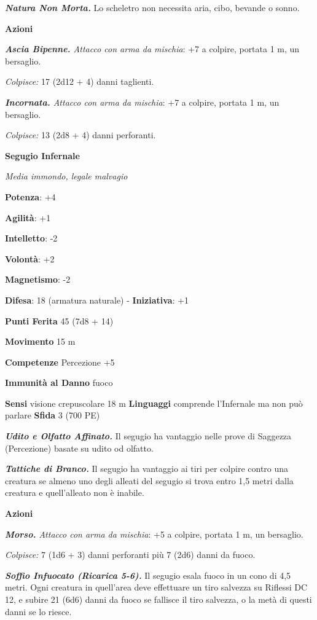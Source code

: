 \begin{multicols}{2}
\emph{\textbf{Natura Non Morta.}} Lo scheletro non necessita aria, cibo,
bevande o sonno.

\smallskip\textbf{Azioni}

\emph{\textbf{Ascia Bipenne.} Attacco con arma da mischia}: +7 a
colpire, portata 1 m, un bersaglio.

\emph{Colpisce:} 17 (2d12 + 4) danni taglienti.

\emph{\textbf{Incornata.} Attacco con arma da mischia}: +7 a colpire,
portata 1 m, un bersaglio.

\emph{Colpisce:} 13 (2d8 + 4) danni perforanti.

\textbf{Segugio Infernale}

\emph{Media immondo, legale malvagio}

\textbf{Potenza}: +4

\textbf{Agilità}: +1

\textbf{Intelletto}: -2

\textbf{Volontà}: +2

\textbf{Magnetismo}: -2

\textbf{Difesa}: 18 (armatura naturale) - \textbf{Iniziativa}: +1

\textbf{Punti Ferita} 45 (7d8 + 14)

\textbf{Movimento} 15 m

\textbf{Competenze} Percezione +5

\textbf{Immunità al Danno} fuoco

\textbf{Sensi} visione crepuscolare 18 m
\textbf{Linguaggi} comprende l'Infernale ma non può parlare
\textbf{Sfida} 3 (700 PE)\smallskip

\emph{\textbf{Udito e Olfatto Affinato.}} Il segugio ha vantaggio nelle
prove di Saggezza (Percezione) basate su udito od olfatto.

\emph{\textbf{Tattiche di Branco.}} Il segugio ha vantaggio ai tiri per
colpire contro una creatura se almeno uno degli alleati del segugio si
trova entro 1,5 metri dalla creatura e quell'alleato non è inabile.

\smallskip\textbf{Azioni}

\emph{\textbf{Morso.} Attacco con arma da mischia}: +5 a colpire,
portata 1 m, un bersaglio.

\emph{Colpisce:} 7 (1d6 + 3) danni perforanti più 7 (2d6) danni da
fuoco.

\emph{\textbf{Soffio Infuocato (Ricarica 5-6).}} Il segugio esala fuoco
in un cono di 4,5 metri. Ogni creatura in quell'area deve effettuare un
tiro salvezza su Riflessi DC 12, e subire 21 (6d6) danni da fuoco se
fallisce il tiro salvezza, o la metà di questi danni se lo riesce.




\end{multicols}
